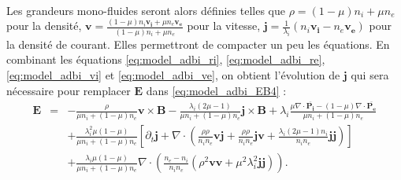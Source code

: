 \begin{eqnarray}
\end{eqnarray}
Les grandeurs mono-fluides seront alors définies telles que $\rho  = (1-\mu) n_i + \mu n_e $ pour la densité, $\boldsymbol{v} = \frac{(1-\mu) n_i \boldsymbol{v_i} + \mu n_e \boldsymbol{v_e}}{(1-\mu) n_i + \mu n_e}$ pour la vitesse, $\boldsymbol{j} =  \frac{1}{\lambda_i} (n_i \boldsymbol{v_i} - n_e \boldsymbol{v_e})$ pour la densité de courant. Elles permettront de compacter un peu les équations. 
En combinant les équations \eqref{eq:model_adbi_ri}, \eqref{eq:model_adbi_re}, \eqref{eq:model_adbi_vi} et \eqref{eq:model_adbi_ve}, on obtient l'évolution de $\boldsymbol{j}$ qui sera nécessaire pour remplacer $\boldsymbol{E}$ dans \eqref{eq:model_adbi_EB4} : 
\begin{eqnarray}
\label{eq:model_adbi_j} \boldsymbol{E} &=& -  \frac{\rho}{\mu n_i + (1-\mu) n_e} \boldsymbol{v}  \times \boldsymbol{B} 
-   \frac{\lambda_i(2\mu-1)}{\mu n_i + (1-\mu) n_e}  \boldsymbol{j} \times \boldsymbol{B}
+  \lambda_i \frac{\mu \nabla \cdot \overline{\boldsymbol{P_i}} - (1-\mu) \nabla \cdot \overline{\boldsymbol{P_e}}}{\mu n_i + (1-\mu) n_e} \nonumber\\
&&+\frac{\lambda_i^2 \mu (1-\mu)}{\mu n_i + (1-\mu) n_e} \left[\partial_t \boldsymbol{j} + \nabla \cdot (
\frac{\rho \rho}{n_i n_e}  \boldsymbol{v}  \boldsymbol{j}  
+\frac{\rho \rho}{n_i n_e}  \boldsymbol{j}  \boldsymbol{v} 
+\frac{ \lambda_i(2\mu -1 )n_i}{n_i n_e}\boldsymbol{j} \boldsymbol{j} ) \right] \nonumber \\
&&+\frac{\lambda_i \mu (1-\mu)}{\mu n_i + (1-\mu) n_e} \nabla \cdot (
\frac{n_e - n_i}{n_i n_e} (\rho^2 \boldsymbol{v} \boldsymbol{v} + \mu^2\lambda_i^2 \boldsymbol{j} \boldsymbol{j})  ).
\end{eqnarray}

